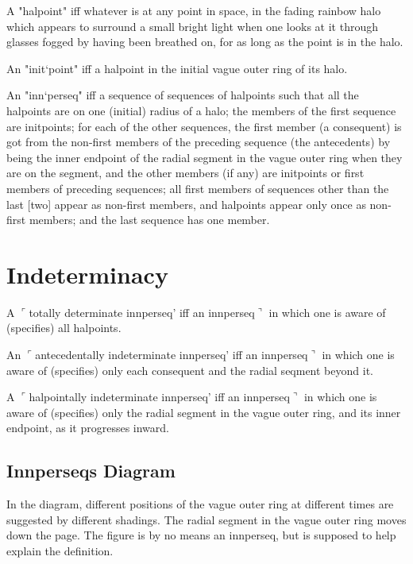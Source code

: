 \begin{sysrules}
A "halpoint" iff whatever is at any point in space, in the fading rainbow halo 
which appears to surround a small bright light when one looks at it through 
glasses fogged by having been breathed on, for as long as the point is in the 
halo. 

An "init`point" iff a halpoint in the initial vague outer ring of its halo. 


An "inn`perseq" iff a sequence of sequences of halpoints such that all the 
halpoints are on one (initial) radius of a halo; the members of the first 
sequence are initpoints; for each of the other sequences, the first member (a 
consequent) is got from the non-first members of the preceding sequence 
(the antecedents) by being the inner endpoint of the radial segment in the 
vague outer ring when they are on the segment, and the other members (if 
any) are initpoints or first members of preceding sequences; all first members 
of sequences other than the last [two] appear as non-first members, and 
halpoints appear only once as non-first members; and the last sequence has 
one member. 
\end{sysrules}

\section*{Indeterminacy}

\begin{sysrules}
A $\ulcorner$totally determinate innperseq' iff an innperseq$\urcorner$ in which one is aware of 
(specifies) all halpoints. 

An $\ulcorner$antecedentally indeterminate innperseq' iff an innperseq$\urcorner$ in which one is 
aware of (specifies) only each consequent and the radial seqment beyond it. 

A $\ulcorner$halpointally indeterminate innperseq' iff an innperseq$\urcorner$ in which one is 
aware of (specifies) only the radial segment in the vague outer ring, and its 
inner endpoint, as it progresses inward. 
\end{sysrules}

\subsection*{Innperseqs Diagram}

In the diagram, different positions of the vague outer ring at different times 
are suggested by different shadings. The radial segment in the vague outer 
ring moves down the page. The figure is by no means an innperseq, but is 
supposed to help explain the definition. 


